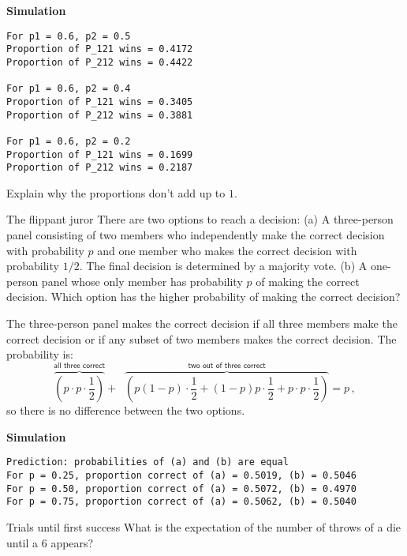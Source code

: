 \textbf{Simulation}
\begin{verbatim}
For p1 = 0.6, p2 = 0.5
Proportion of P_121 wins = 0.4172
Proportion of P_212 wins = 0.4422

For p1 = 0.6, p2 = 0.4
Proportion of P_121 wins = 0.3405
Proportion of P_212 wins = 0.3881

For p1 = 0.6, p2 = 0.2
Proportion of P_121 wins = 0.1699
Proportion of P_212 wins = 0.2187
\end{verbatim}
Explain why the proportions don't add up to $1$.


\begin{prob}{The flippant juror}
There are two options to reach a decision: (a) A three-person panel consisting of two members who independently make the correct decision with probability $p$ and one member who makes the correct decision with probability $1/2$. The final decision is determined by a majority vote. (b) A one-person panel whose only member has probability $p$ of making the correct decision. Which option has the higher probability of making the correct decision?
\end{prob}

\solution{}

The three-person panel makes the correct decision if all three members make the correct decision or if any subset of two members makes the correct decision. The probability is:
\[
\overbrace{\left(p\cdot p\cdot\frac{1}{2}\right)}^{\textsf{all three correct}}+\;\;\overbrace{\left(p(1-p)\cdot\frac{1}{2}+(1-p)p\cdot\frac{1}{2}+p\cdot p\cdot\frac{1}{2}\right)}^{\textsf{two out of three correct}}=p\,,
\]
so there is no difference between the two options.

\textbf{Simulation}
\begin{verbatim}
Prediction: probabilities of (a) and (b) are equal
For p = 0.25, proportion correct of (a) = 0.5019, (b) = 0.5046
For p = 0.50, proportion correct of (a) = 0.5072, (b) = 0.4970
For p = 0.75, proportion correct of (a) = 0.5062, (b) = 0.5040
\end{verbatim}


\begin{prob}{Trials until first success}
\label{p.four}
What is the expectation of the number of throws of a die until a $6$ appears?
\end{prob}

